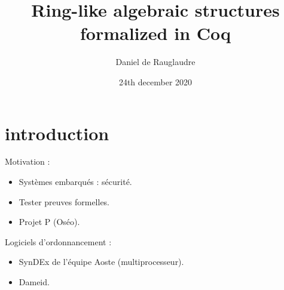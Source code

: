 \documentclass[t]{beamer}
\begin{document}
\title[Irif - Inria - 24th dec 2020] 
{Ring-like algebraic structures \\
  formalized in Coq}
\author{Daniel de Rauglaudre}
\date{24th december 2020}
\frame{\titlepage}




\section[Plan]{}

\section{introduction}

 {

  Motivation :
  \begin{itemize}
  \item Systèmes embarqués : sécurité.
  \item Tester preuves formelles.
  \item Projet P (Oséo).
  \end{itemize}
  \vsp
  Logiciels d'ordonnancement :
  \begin{itemize}
  \item SynDEx de l'équipe Aoste (multiprocesseur).
  \item Dameid.
  \end{itemize}
}
\end{document}
